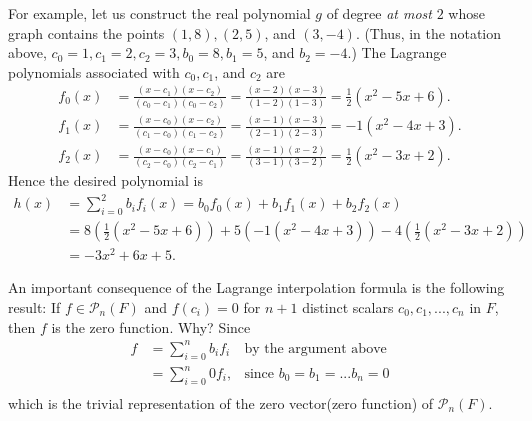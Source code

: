 For example, let us construct the real polynomial \(g\) of degree \emph{at most} \(2\) whose graph contains the points \((1, 8), (2, 5)\), and \((3, -4)\).
(Thus, in the notation above, \(c_0 = 1, c_1 = 2, c_2 = 3, b_0 = 8, b_1 = 5\), and \(b_2 = -4\).)
The Lagrange polynomials associated with \(c_0, c_1\), and \(c_2\) are
\begin{align*}
    f_0(x) & = \frac{(x - c_1)(x - c_2)}{(c_0 - c_1)(c_0 - c_2)} = \frac{(x - 2)(x - 3)}{(1 - 2)(1 - 3)} = \frac{1}{2}(x^2 - 5x + 6). \\
    f_1(x) & = \frac{(x - c_0)(x - c_2)}{(c_1 - c_0)(c_1 - c_2)} = \frac{(x - 1)(x - 3)}{(2 - 1)(2 - 3)} = -1(x^2 - 4x + 3). \\
    f_2(x) & = \frac{(x - c_0)(x - c_1)}{(c_2 - c_0)(c_2 - c_1)} = \frac{(x - 1)(x - 2)}{(3 - 1)(3 - 2)} = \frac{1}{2}(x^2 - 3x + 2).
\end{align*}
Hence the desired polynomial is
\begin{align*}
    h(x) & = \sum_{i = 0}^2 b_i f_i(x) = b_0 f_0(x) + b_1 f_1(x) + b_2 f_2(x) \\
         & = 8 (\frac{1}{2}(x^2 - 5x + 6)) + 5 (-1(x^2 - 4x + 3)) - 4 (\frac{1}{2}(x^2 - 3x + 2)) \\
         & = -3x^2 + 6x + 5.
\end{align*}

\begin{remark} \label{remark 1.6.6}
An important consequence of the Lagrange interpolation formula is the following result:
If \(f \in \mathcal{P}_n(F)\) and \(f(c_i) = 0\) for \(n + 1\) distinct scalars \(c_0, c_1, ..., c_n\) in \(F\),
then \(f\) is the zero function.
Why? Since
\begin{align*}
    f & = \sum_{i = 0}^n b_i f_i & \text{by the argument above} \\
      & = \sum_{i = 0}^n 0 f_i, & \text{since \(b_0 = b_1 = ... b_n = 0\)} \\
\end{align*}
which is the trivial representation of the zero vector(zero function) of \(\mathcal{P}_n(F)\).
\end{remark}